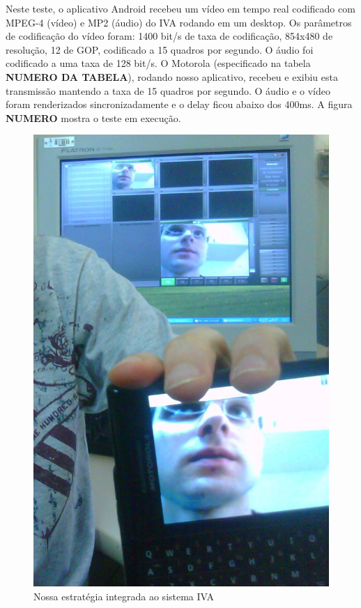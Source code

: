 \documentclass{acm_proc_article-sp}
\newcommand{\todo}[1]{\textcolor[rgb]{1.00,0.00,0.00}{\bf \uppercase{#1}}}
\begin{document}
Neste teste, o aplicativo Android recebeu um vídeo em tempo real codificado com MPEG-4 (vídeo) e MP2 (áudio) do IVA rodando em um desktop. Os parâmetros de codificação do vídeo foram: 1400 bit/s de taxa de codificação, 854x480 de resolução, 12 de GOP, codificado a 15 quadros por segundo. O áudio foi codificado a uma taxa de 128 bit/s. O Motorola (especificado na tabela \todo{numero da tabela}), rodando nosso aplicativo, recebeu e exibiu esta transmissão mantendo a taxa de 15 quadros por segundo. O áudio e o vídeo foram renderizados sincronizadamente e o delay ficou abaixo dos 400ms. A figura \todo{numero} mostra o teste em execução.
\begin{figure}
 \centering
 \includegraphics[scale=0.2]{./ivamobile.jpg}
\caption{Nossa estratégia integrada ao sistema IVA}
\end{figure}
\end{document}
